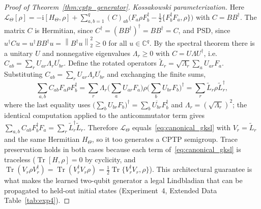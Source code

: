 \documentclass[11pt]{article}
\DeclareMathOperator{\Tr}{Tr}
\newcommand{\C}{\mathbb{C}}
\newcommand{\calL}{\mathcal{L}}
\newcommand{\ii}{\mathrm{i}}
\newcommand{\norm}[1]{\left\lVert #1 \right\rVert}
\begin{document}
\begin{proof}[Proof of Theorem~\ref{thm:cptp_generator}]
\emph{Kossakowski parameterization.} Here $\calL_\Theta[\rho]=-\ii[H_\Theta,\rho]+\sum_{a,b=1}^q(C)_{ab}\big(F_a\rho F_b^\dagger-\tfrac12\{F_b^\dagger F_a,\rho\}\big)$ with $C=BB^\dagger$. The matrix $C$ is Hermitian, since $C^\dagger=(BB^\dagger)^\dagger=BB^\dagger=C$, and PSD, since $u^\dagger C u=u^\dagger BB^\dagger u=\norm{B^\dagger u}_2^2\ge0$ for all $u\in\C^q$. By the spectral theorem there is a unitary $U$ and nonnegative eigenvalues $\Lambda_r\ge0$ with $C=U\Lambda U^\dagger$, i.e.\ $C_{ab}=\sum_r U_{ar}\Lambda_r\overline{U_{br}}$. Define the rotated operators $\widetilde L_r=\sqrt{\Lambda_r}\sum_a U_{ar}F_a$. Substituting $C_{ab}=\sum_r U_{ar}\Lambda_r\overline{U_{br}}$ and exchanging the finite sums,
\[
\sum_{a,b}C_{ab}F_a\rho F_b^\dagger=\sum_r\Lambda_r\Big(\sum_a U_{ar}F_a\Big)\rho\Big(\sum_b U_{br}F_b\Big)^\dagger=\sum_r\widetilde L_r\rho\widetilde L_r^\dagger,
\]
where the last equality uses $\big(\sum_b U_{br}F_b\big)^\dagger=\sum_b\overline{U_{br}}F_b^\dagger$ and $\Lambda_r=(\sqrt{\Lambda_r})^2$; the identical computation applied to the anticommutator term gives $\sum_{a,b}C_{ab}F_b^\dagger F_a=\sum_r\widetilde L_r^\dagger\widetilde L_r$. Therefore $\calL_\Theta$ equals~\eqref{eq:canonical_gksl} with $V_r=\widetilde L_r$ and the same Hermitian $H_\Theta$, so it too generates a CPTP semigroup. Trace preservation holds in both cases because each term of~\eqref{eq:canonical_gksl} is traceless ($\Tr[H,\rho]=0$ by cyclicity, and $\Tr(V_r\rho V_r^\dagger)=\Tr(V_r^\dagger V_r\rho)=\tfrac12\Tr\{V_r^\dagger V_r,\rho\}$). This architectural guarantee is what makes the learned two-qubit generator a legal Lindbladian that can be propagated to held-out initial states (Experiment~4, Extended Data Table~\ref{tab:exp4}).
\end{proof}
\end{document}
